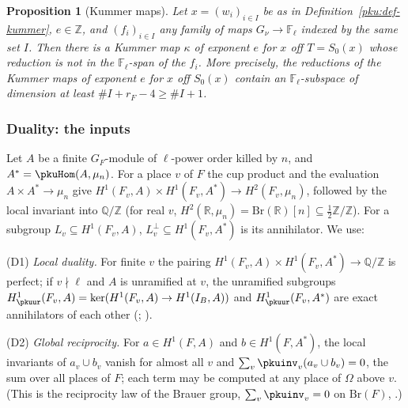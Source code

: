 \documentclass[10pt]{amsart}
\newtheorem{proposition}[theorem]{Proposition}
\theoremstyle{definition}
\theoremstyle{remark}
\newcommand{\R}{\mathbb R}
\newcommand{\Z}{\mathbb Z}
\newcommand{\Q}{\mathbb Q}
\begin{document}
\begin{proposition}[Kummer maps]\label{pku:main}
Let $x=(w_i)_{i\in I}$ be as in Definition~\ref{pku:def-kummer}, $e\in\Z$, and $(f_i)_{i\in I}$ any
family of maps $G_\nu\to\mathbb F_\ell$ indexed by the same set $I$. Then there is a Kummer map
$\kappa$ of exponent $e$ for $x$ off $T=S_0(x)$ whose reduction is not in the $\mathbb F_\ell$-span
of the $f_i$. More precisely, the reductions of the Kummer maps of exponent $e$ for $x$ off $S_0(x)$
contain an $\mathbb F_\ell$-subspace of dimension at least $\#I+r_F-4\ge\#I+1$.
\end{proposition}

\subsubsection{Duality: the inputs}\label{pku:ss-duality}

Let $A$ be a finite $G_F$-module of $\ell$-power order killed by $n$, and $A^*=\pkuHom(A,\mu_n)$.
For a place $v$ of $F$ the cup product and the evaluation $A\times A^*\to\mu_n$ give
$H^1(F_v,A)\times H^1(F_v,A^*)\to H^2(F_v,\mu_n)$, followed by the local invariant into $\Q/\Z$
(for real $v$, $H^2(\R,\mu_n)=\mathrm{Br}(\R)[n]\subseteq\frac12\Z/\Z$). For a subgroup $L_v\subseteq
H^1(F_v,A)$, $L_v^\perp\subseteq H^1(F_v,A^*)$ is its annihilator. We use:

\smallskip\noindent(D1) \emph{Local duality.} For finite $v$ the pairing $H^1(F_v,A)\times H^1(F_v,
A^*)\to\Q/\Z$ is perfect; if $v\nmid\ell$ and $A$ is unramified at $v$, the unramified subgroups
$H^1_\pkuur(F_v,A)=\ker(H^1(F_v,A)\to H^1(I_B,A))$ and $H^1_\pkuur(F_v,A^*)$ are exact annihilators of
each other (\cite[Ch.~I, Corollary~2.3 and Theorem~2.6]{MilneADT}; \cite[Theorems~7.2.6 and 7.2.15]{NSW}).

\smallskip\noindent(D2) \emph{Global reciprocity.} For $a\in H^1(F,A)$ and $b\in H^1(F,A^*)$, the
local invariants of $a_v\cup b_v$ vanish for almost all $v$ and $\sum_v\pkuinv_v(a_v\cup b_v)=0$, the
sum over all places of $F$; each term may be computed at any place of $\Omega$ above $v$. (This is
the reciprocity law of the Brauer group, $\sum_v\pkuinv_v=0$ on $\mathrm{Br}(F)$,
\cite[Theorem~8.1.17]{NSW}.)
\end{document}
